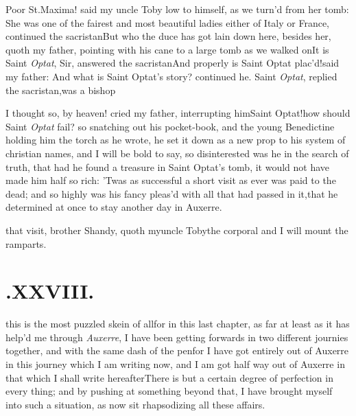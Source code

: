 \documentclass{article}
\begin{document}
\tsh Poor St.\@ Maxima! said my uncle Toby low to himself, as we
turn’d from her tomb: She was one of the fairest and most
beautiful ladies either of Italy or France, continued the
sacristan\break\tsh But who the duce has got lain down here, besides
her, quoth my father, pointing with his cane to a large tomb as
we walked on\tsh It is Saint \textit{Optat}, Sir, answered the
sacristan\tsh And properly is Saint Optat plac’d!\@ said my
father: And what is Saint Optat’s story? continued he. Saint
\textit{Optat}, replied the sacristan,\break was a bishop\tsh{}

\tsh I thought so, by heaven! cried 
my father, interrupting him\tsk Saint\break
Optat!\tsh how should Saint \textit{Optat} fail?\break
so snatching out his pocket-book, and the young Benedictine
holding him the torch as he wrote, he set it down as a new prop
to his system of christian names, and I will be bold to say, so
disinterested was he in the search of truth, that had he found a
treasure in Saint Optat’s tomb, it would not have made him half
so rich: ’Twas as successful a short visit as ever was paid to
the dead; and so highly was his fancy pleas’d with all that had
passed in it,\tsk that he determined at once to stay another day
in Auxerre.

\noindent
{}
that visit, brother Shandy, quoth my\break uncle
Toby\tsk the corporal and I will mount the ramparts.

\section{.\enspace XXVIII.}

 this is the most puzzled\break
skein of all\tsh for in this\break
last chapter, as far at least as it has help’d me through
\textit{Auxerre}, I have been getting forwards in two different
journies together, and with the same dash of the pen\tsk for I
have got entirely out of Auxerre in this journey which I am
writing now, and I am got half way out of Auxerre in that which
I shall write hereafter\tsk There is but a certain degree of
perfection in every thing; and by pushing at something beyond
that, I have brought myself into such a situation, as
now sit rhapsodizing all these affairs.
\end{document}
